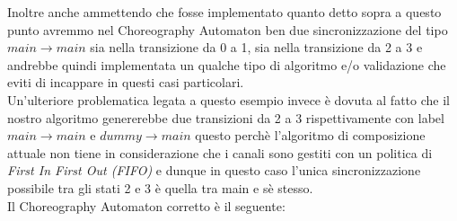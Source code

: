 Inoltre anche ammettendo che fosse implementato quanto detto sopra a questo punto avremmo nel Choreography Automaton ben due sincronizzazione del tipo $main \rightarrow main$ sia nella transizione da 0 a 1, sia nella transizione da 2 a 3 e andrebbe quindi implementata un qualche tipo di algoritmo e/o validazione che eviti di incappare in questi casi particolari.\\
Un'ulteriore problematica legata a questo esempio invece è dovuta al fatto che il nostro algoritmo genererebbe due transizioni da 2 a 3 rispettivamente con label $main \rightarrow main$ e $dummy \rightarrow main$ questo perchè l'algoritmo di composizione attuale non tiene in considerazione che i canali sono gestiti con un politica di \emph{First In First Out (FIFO)} e dunque in questo caso l'unica sincronizzazione possibile tra gli stati 2 e 3 è quella tra main e sè stesso.\bigskip \\
Il Choreography Automaton corretto è il seguente:
\begin{figure}[h!]
\end{figure}